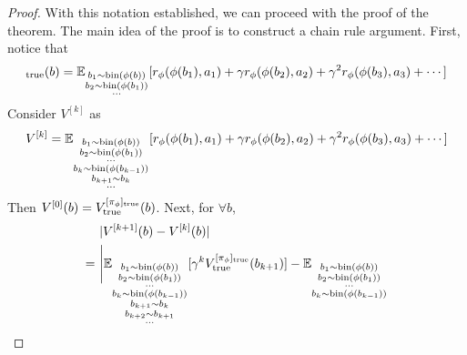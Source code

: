 \documentclass[twoside]{article}
\begin{document}
\begin{proof}
With this notation established, we can proceed with the proof of the theorem. The main idea of the proof is to construct a chain rule argument. First, notice that
        \begin{align}
            [{V}^{\pi_\phi}_{\rm bin}]_{\rm true}(b)=\mathbb{E}_{\substack{
              b_1\sim {\rm bin}(\phi(b)) \\
              b_2\sim {\rm bin}(\phi(b_1)) \\
              \cdots
            }}
            [r_\phi(\phi(b_1),a_1)+\gamma r_\phi(\phi(b_2),a_2)+\gamma^2r_\phi(\phi(b_3),a_3)+\cdots]
        \end{align}
        Consider $V^{[k]}$ as
        \begin{align}
            V^{[k]}=\mathbb{E}_{\substack{
              b_1\sim {\rm bin}(\phi(b)) \\
              b_2\sim {\rm bin}(\phi(b_1)) \\
              \cdots \\
              b_k\sim {\rm bin}(\phi(b_{k-1})) \\
              b_{k+1} \sim b_k \\
              \cdots
            }}
            [r_\phi(\phi(b_1),a_1)+\gamma r_\phi(\phi(b_2),a_2)+\gamma^2r_\phi(\phi(b_3),a_3)+\cdots]
        \end{align}
        Then $V^{[0]}(b)={V}^{[\pi_\phi]_{\rm true}}_{\rm true}(b)$.
        Next, for $\forall b$,
        \begingroup
        \allowdisplaybreaks
        \begin{align}
            &\ |V^{[k+1]}(b)-V^{[k]}(b)|\\
            =&\ \Bigg|\mathbb{E}_{\substack{
              b_1\sim {\rm bin}(\phi(b)) \\
              b_2\sim {\rm bin}(\phi(b_1)) \\
              \cdots \\
              b_k\sim {\rm bin}(\phi(b_{k-1})) \\
              b_{k+1} \sim b_k \\
              b_{k+2} \sim b_{k+1} \\
              \cdots
            }}
            [\gamma^{k}V_{\rm true}^{[\pi_\phi]_{\rm true}}(b_{k+1})]-
            \mathbb{E}_{\substack{
              b_1\sim {\rm bin}(\phi(b)) \\
              b_2\sim {\rm bin}(\phi(b_1)) \\
              \cdots \\
              b_k\sim {\rm bin}(\phi(b_{k-1})) \\
}}
\end{align}
\end{proof}
\end{document}
